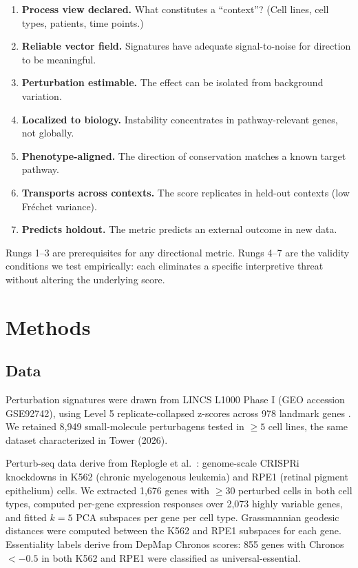 \documentclass{article}
\begin{document}
\begin{enumerate}
  \item \textbf{Process view declared.} What constitutes a ``context''?
    (Cell lines, cell types, patients, time points.)
  \item \textbf{Reliable vector field.} Signatures have adequate signal-to-noise
    for direction to be meaningful.
  \item \textbf{Perturbation estimable.} The effect can be isolated from
    background variation.
  \item \textbf{Localized to biology.} Instability concentrates in
    pathway-relevant genes, not globally.
  \item \textbf{Phenotype-aligned.} The direction of conservation matches a
    known target pathway.
  \item \textbf{Transports across contexts.} The score replicates in held-out
    contexts (low Fr\'echet variance).
  \item \textbf{Predicts holdout.} The metric predicts an external outcome
    in new data.
\end{enumerate}

Rungs 1--3 are prerequisites for any directional metric. Rungs 4--7 are the
validity conditions we test empirically: each eliminates a specific
interpretive threat without altering the underlying score.

\section{Methods}

\subsection{Data}

Perturbation signatures were drawn from LINCS L1000 Phase I (GEO accession
GSE92742), using Level 5 replicate-collapsed z-scores across 978 landmark
genes \citep{subramanian2017next}. We retained 8{,}949 small-molecule
perturbagens tested in $\geq5$ cell lines, the same dataset characterized in
Tower (2026).

Perturb-seq data derive from Replogle et al.\
\citep{replogle2022mapping}: genome-scale CRISPRi knockdowns in K562
(chronic myelogenous leukemia) and RPE1 (retinal pigment epithelium)
cells. We extracted 1{,}676 genes with $\geq$30 perturbed cells in both
cell types, computed per-gene expression responses over 2{,}073 highly
variable genes, and fitted $k = 5$ PCA subspaces per gene per cell type.
Grassmannian geodesic distances were computed between the K562 and RPE1
subspaces for each gene. Essentiality labels derive from DepMap Chronos
scores: 855 genes with Chronos $< -0.5$ in both K562 and RPE1 were
classified as universal-essential.
\end{document}
